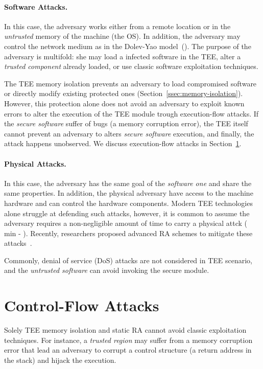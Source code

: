 \paragraph{Software Attacks.} 
In this case, the adversary works either from a remote location or in the 
\emph{untrusted} memory of the machine (\eg the OS).
In addition, the adversary may control the network medium as in the Dolev-Yao 
model~(\cite{dolev}).
The purpose of the adversary is multifold: she may load a infected software in 
the TEE, alter a \emph{trusted component} already loaded, or use classic 
software exploitation techniques.

The TEE memory isolation prevents an adversary to load compromised software or 
directly modify existing protected ones (Section~\ref{ssec:memory-isolation}).
However, this protection alone does not avoid an adversary to exploit known 
errors to alter the execution of the TEE module trough execution-flow 
attacks.
If the \emph{secure software} suffer of bugs (\eg a memory corruption error), 
the TEE itself cannot prevent an adversary to alters \emph{secure software} 
execution, and finally, the attack happens unobserved.
We discuss execution-flow attacks in Section~\ref{sec:control-flow-attacks}.

\paragraph{Physical Attacks.}
In this case, the adversary has the same goal of the \emph{software 
one} and share the same properties. In addition, the physical adversary have 
access to the machine hardware and can control the hardware components.
Modern TEE technologies alone struggle at defending such attacks, however, it 
is common to assume the adversary requires a non-negligible amount of time to 
carry a physical attck ( min - 
\cite{conti2010smallville,conti2008emergent,darpa,ibrahim2017seed,pasta,us-aid}).
Recently, researchers proposed advanced RA schemes to mitigate these 
attacks~\citep{darpa,visintin2019safe,pasta}.

Commonly, denial of service (DoS) attacks are not considered in TEE scenario, 
and the \emph{untrusted software} can avoid invoking the secure module.

\section{Control-Flow Attacks}
\label{sec:control-flow-attacks}

Solely TEE memory isolation and static RA cannot avoid classic exploitation 
techniques.
For instance, a \emph{trusted region} may suffer from a memory corruption 
error that lead an adversary to corrupt a control structure (\ie a return 
address in the stack) and hijack the execution.

